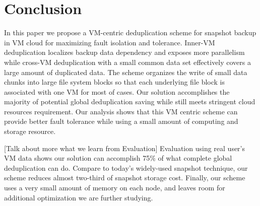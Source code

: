 \section{Conclusion}
\label{sect:final}
In this paper we propose a VM-centric deduplication scheme for 
snapshot backup in VM cloud for maximizing fault isolation and tolerance. 
Inner-VM deduplication localizes backup data dependency and exposes more parallelism  
while cross-VM deduplication with a small common data set
effectively  covers a large amount of duplicated data.
The scheme organizes the write of small data chunks into large file system blocks so
that each underlying file block is associated with one VM for most of cases.
Our solution accomplishes the majority of
potential global deduplication saving while still meets stringent cloud resources requirement. 
Our analysis shows that  this VM centric scheme 
can  provide  better fault tolerance while using a small amount of computing and storage resource. 


[Talk about more what we learn from Evaluation]
Evaluation using real user's VM data shows
our solution can accomplish 75\% of what complete global
deduplication can do. 
Compare to today's widely-used snapshot technique, our scheme reduces almost
two-third of snapshot storage cost.
Finally, our scheme uses a very small amount of memory on each node, and leaves
room for additional optimization we are further studying.




 
